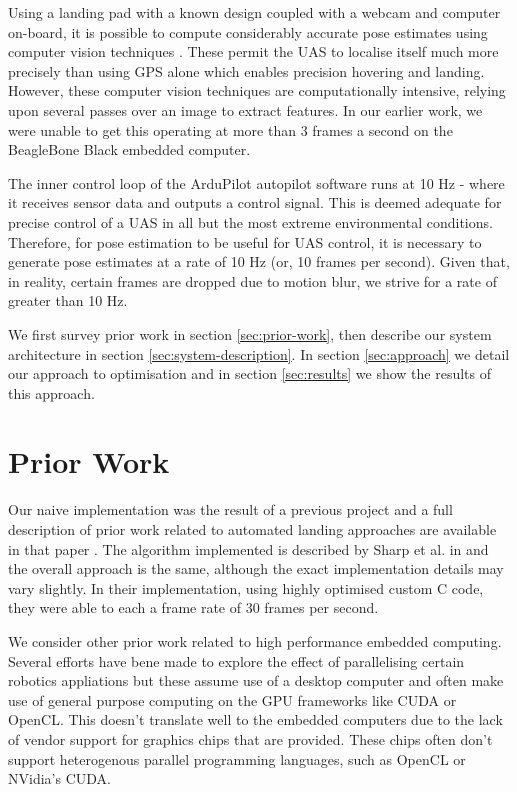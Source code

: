 \documentclass{acm_proc_article-sp}
\begin{document}
Using a landing pad with a known design coupled with a webcam and computer on-board, it is possible to compute considerably accurate pose estimates using computer vision techniques \cite{berzanaccurate}. These permit the UAS to localise itself much more precisely than using GPS alone which enables precision hovering and landing. However, these computer vision techniques are computationally intensive, relying upon several passes over an image to extract features. In our earlier work, we were unable to get this operating at more than 3 frames a second on the BeagleBone Black embedded computer. 

The inner control loop of the ArduPilot autopilot software runs at 10 Hz - where it receives sensor data and outputs a control signal. This is deemed adequate for precise control of a UAS in all but the most extreme environmental conditions. Therefore, for pose estimation to be useful for UAS control, it is necessary to generate pose estimates at a rate of 10 Hz (or, 10 frames per second). Given that, in reality, certain frames are dropped due to motion blur, we strive for a rate of greater than 10 Hz.

We first survey prior work in section \ref{sec:prior-work}, then describe our system architecture in section \ref{sec:system-description}. In section \ref{sec:approach} we detail our approach to optimisation and in section \ref{sec:results} we show the results of this approach.

\section{Prior Work\label{sec:prior-work}}
Our naive implementation was the result of a previous project and a full description of prior work related to automated landing approaches are available in that paper \cite{berzanaccurate}. The algorithm implemented is described by Sharp et al. in \cite{sharp_et_al_2001} and the overall approach is the same, although the exact implementation details may vary slightly. In their implementation, using highly optimised custom C code, they were able to each a frame rate of 30 frames per second. 

We consider other prior work related to high performance embedded computing. Several efforts have bene made to explore the effect of parallelising certain robotics appliations but these assume use of a desktop computer and often make use of general purpose computing on the GPU frameworks like CUDA or OpenCL. This doesn't translate well to the embedded computers due to the lack of vendor support for graphics chips that are provided. These chips often don't support heterogenous parallel programming languages, such as OpenCL or NVidia's CUDA. 
\end{document}
